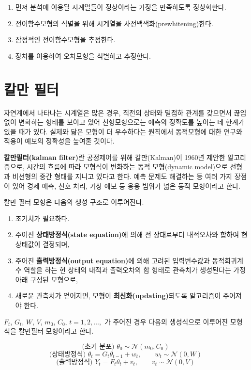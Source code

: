 \documentclass[b5paper,]{book}
\theoremstyle{definition}
\theoremstyle{definition}
\theoremstyle{definition}
\theoremstyle{remark}
\begin{document}
\begin{enumerate}
\def\labelenumi{\arabic{enumi}.}
\item
  먼저 분석에 이용될 시계열들이 정상이라는 가정을 만족하도록 정상화한다.
\item
  전이함수모형의 식별을 위해 시계열을 사전백색화(prewhitening)한다.
\item
  잠정적인 전이함수모형을 추정한다.
\item
  장차를 이용하여 오차모형을 식별하고 추정한다.
\end{enumerate}

\chapter{칼만 필터}\label{kalman}

자연계에서 나타나는 시계열은 많은 경우, 직전의 상태와 밀접하 관계를
갖으면서 끊임없이 변화하는 형태를 보이고 있어 선형모형으로는 예측의
정확도를 높이는 데 한계가 있을 때가 있다. 실제와 닮은 모형이 더
우수하다는 원칙에서 동적모형에 대한 연구와 적용이 예보의 정확성을 높여줄
것이다.

\textbf{칼만필터(kalman filter)}란 공정제어를 위해 칼만(Kalman)이 1960년
제안한 알고리즘으로, 시간의 흐름에 따라 모형식이 변화하는 동적
모형(dynamic model)으로 선형과 비선형의 중간 형태를 지니고 있다고 한다.
예측 문제도 해결하는 등 여러 가지 장점이 있어 경제 에측, 신호 처리, 기상
예보 등 응용 범위가 넓은 동적 모형이라고 한다.

칼만 필터 모형은 다음의 생성 구조로 이루어진다.

\begin{enumerate}
\def\labelenumi{\arabic{enumi}.}
\item
  초기치가 필요하다.
\item
  주어진 \textbf{상태방정식(state equation)}에 의해 전 상태로부터
  내적오차와 합하여 현 상태값이 결정되며,
\item
  주어진 \textbf{출력방정식(output equation)}에 의해 고려된 입력변수값과
  동적회귀계수 역할을 하는 현 상태의 내적과 출력오차의 합 형태로
  관측치가 생성된다는 가정 아래 구성된 모형으로,
\item
  새로운 관측치가 얻어지면, 모형이 \textbf{최신화(updating)}되도록
  알고리즘이 주어져야 한다.
\end{enumerate}

\(F_{t}\), \(G_{t}\), \(W\), \(V\), \(m_{0}\), \(C_{0}\),
\(t=1,2,\ldots,\) 가 주어진 경우 다음의 생성식으로 이루어진 모형식을
칼만필터 모형이라고 한다.

\[\text{(초기 분포) } \theta_{0} \sim \mathcal{N}(m_{0},C_{0})\]
\[\text{(상태방정식) } \theta_{t}=G_{t}\theta_{t-1}+w_{t}, \qquad{w_{t} \sim \mathcal{N}(0,W)}\]
\[\text{(출력방정식) } Y_{t}=F_{t}\theta_{t}+v_{t}, \qquad{v_{t}\sim \mathcal{N}(0,V)}\]
\end{document}
